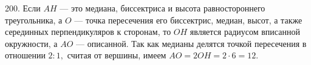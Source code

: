 200. Если $AH$ --- это медиана, биссектриса и высота равностороннего треугольника, а $O$ --- точка пересечения его биссектрис, медиан, высот, а также серединных перпендикуляров к сторонам, то $OH$ является радиусом вписанной окружности, а $AO$ --- описанной. Так как медианы делятся точкой пересечения в отношении $2:1,$ считая от вершины, имеем $AO=2OH=2\cdot6=12.$\\
